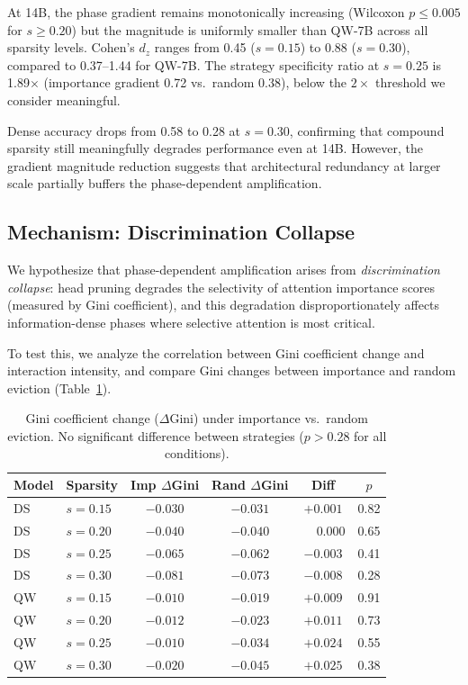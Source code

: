 \documentclass[11pt,a4paper]{article}
\begin{document}
At 14B, the phase gradient remains monotonically increasing (Wilcoxon $p \leq 0.005$ for $s \geq 0.20$) but the magnitude is uniformly smaller than QW-7B across all sparsity levels. Cohen's $d_z$ ranges from 0.45 ($s=0.15$) to 0.88 ($s=0.30$), compared to 0.37--1.44 for QW-7B. The strategy specificity ratio at $s=0.25$ is 1.89$\times$ (importance gradient 0.72 vs.\ random 0.38), below the $2\times$ threshold we consider meaningful.

Dense accuracy drops from 0.58 to 0.28 at $s=0.30$, confirming that compound sparsity still meaningfully degrades performance even at 14B. However, the gradient magnitude reduction suggests that architectural redundancy at larger scale partially buffers the phase-dependent amplification.

\subsection{Mechanism: Discrimination Collapse}
\label{sec:mechanism}

We hypothesize that phase-dependent amplification arises from \emph{discrimination collapse}: head pruning degrades the selectivity of attention importance scores (measured by Gini coefficient), and this degradation disproportionately affects information-dense phases where selective attention is most critical.

To test this, we analyze the correlation between Gini coefficient change and interaction intensity, and compare Gini changes between importance and random eviction (Table~\ref{tab:gini}).

\begin{table}[t]
\centering
\small
\caption{Gini coefficient change ($\Delta$Gini) under importance vs.\ random eviction. No significant difference between strategies ($p > 0.28$ for all conditions).}
\label{tab:gini}
\begin{tabular}{llcccc}
\toprule
Model & Sparsity & Imp $\Delta$Gini & Rand $\Delta$Gini & Diff & $p$ \\
\midrule
DS & $s{=}0.15$ & $-0.030$ & $-0.031$ & $+0.001$ & 0.82 \\
DS & $s{=}0.20$ & $-0.040$ & $-0.040$ & $\phantom{+}0.000$ & 0.65 \\
DS & $s{=}0.25$ & $-0.065$ & $-0.062$ & $-0.003$ & 0.41 \\
DS & $s{=}0.30$ & $-0.081$ & $-0.073$ & $-0.008$ & 0.28 \\
QW & $s{=}0.15$ & $-0.010$ & $-0.019$ & $+0.009$ & 0.91 \\
QW & $s{=}0.20$ & $-0.012$ & $-0.023$ & $+0.011$ & 0.73 \\
QW & $s{=}0.25$ & $-0.010$ & $-0.034$ & $+0.024$ & 0.55 \\
QW & $s{=}0.30$ & $-0.020$ & $-0.045$ & $+0.025$ & 0.38 \\
\bottomrule
\end{tabular}
\end{table}
\end{document}
